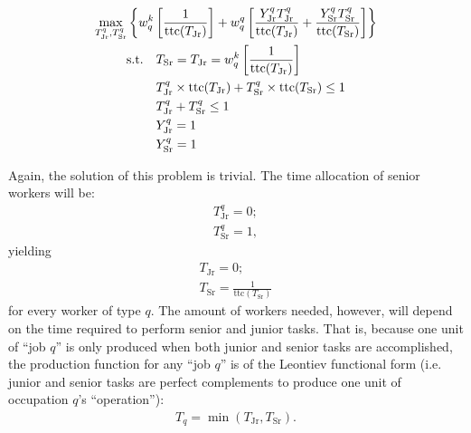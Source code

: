 \documentclass{elsarticle} %
\begin{document}
\begin{gather*}
    \max_{
        T_{\text{Jr}}^{q},
        T_{\text{Sr}}^{q}
    }{%
        \left\{
            w_{q}^{k}
            \left[
                \frac{1}{\text{ttc}(T_{\text{Jr}})}
            \right]
             + 
            w_{q}^{q}
            \left[
                \frac{
                    Y_{\text{Jr}}^{q}
                    T_{\text{Jr}}^{q}
                }{
                    \text{ttc}(T_{\text{Jr}})
                } + 
                \frac{
                    Y_{\text{Sr}}^{q}
                    T_{\text{Sr}}^{q}
                }{
                    \text{ttc}(T_{\text{Sr}})
                }
            \right]
        \right\}
    }\\
    \begin{align*}
        \text{s.t.} \quad
        & T_{\text{Sr}} = 
        T_{\text{Jr}} = 
        w_{q}^{k}
        \left[
            \frac{1}{\text{ttc}(T_{\text{Jr}})}
        \right]
        \\
        & T_{\text{Jr}}^{q} \times \text{ttc}(T_{\text{Jr}}) +
        T_{\text{Sr}}^{q} \times \text{ttc}(T_{\text{Sr}}) 
        \leq 1
        \\
        & T_{\text{Jr}}^{q} + T_{\text{Sr}}^{q} \leq 1
        \\
        & Y_{\text{Jr}}^{q} = 1
        \\
        & Y_{\text{Sr}}^{q} = 1
    \end{align*}
\end{gather*}

Again, the solution of this problem is trivial. The time allocation of senior workers will be:
\begin{gather*}
    T_{\text{Jr}}^{q} = 0
    ;\\
    T_{\text{Sr}}^{q} = 1
    ,
\end{gather*}
yielding
\begin{gather*}
    T_{\text{Jr}} = 0
    ;\\
    T_{\text{Sr}} = 
    \frac{1}{\text{ttc}(T_{\text{Sr}})}
\end{gather*}
for every worker of type $q$.
The amount of workers needed, however, will depend on the time required to perform senior and junior tasks. That is, because one unit of ``job $q$'' is only produced when both junior and senior tasks are accomplished, the production function for any ``job $q$'' is of the Leontiev functional form (i.e. junior and senior tasks are perfect complements to produce one unit of occupation $q$'s ``operation''):
\begin{align*}
    T_q = \min(T_{\text{Jr}}, T_{\text{Sr}})
    .
\end{align*}
\end{document}
